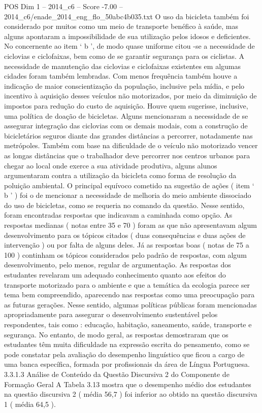 \begin{textsample}{POS Dim 1 – 2014\_c6 – Score -7.00 – 2014\_c6/enade\_2014\_eng\_flo\_50abc4b035.txt}
O uso da bicicleta também foi considerado por muitos como um meio de transporte benéfico à saúde, mas alguns apontaram a impossibilidade de sua utilização pelos idosos e deficientes.
No concernente ao item ‘ b ’, de modo quase uniforme citou -se a necessidade de ciclovias e ciclofaixas, bem como de se garantir segurança para os ciclistas.
A necessidade de manutenção das ciclovias e ciclofaixas existentes em algumas cidades foram também lembradas.
Com menos frequência também houve a indicação de maior conscientização da população, inclusive pela mídia, e pelo incentivo à aquisição desses veículos não motorizados, por meio da diminuição de impostos para redução do custo de aquisição.
Houve quem sugerisse, inclusive, uma política de doação de bicicletas.
Alguns mencionaram a necessidade de se assegurar integração das ciclovias com os demais modais, com a construção de bicicletários seguros diante das grandes distâncias a percorrer, notadamente nas metrópoles.
Também com base na dificuldade de o veículo não motorizado vencer as longas distâncias que o trabalhador deve percorrer nos centros urbanos para chegar ao local onde exerce a sua atividade produtiva, alguns alunos argumentaram contra a utilização da bicicleta como forma de resolução da poluição ambiental.
O principal equívoco cometido na sugestão de ações ( item ‘ b ’ ) foi o de mencionar a necessidade de melhoria do meio ambiente dissociado do uso de bicicletas, como se requeria no comando da questão.
Nesse sentido, foram encontradas respostas que indicavam a caminhada como opção.
As respostas medianas ( notas entre 35 e 70 ) foram as que não apresentavam algum desenvolvimento para os tópicos citados ( duas consequências e duas ações de intervenção ) ou por falta de alguns deles.
Já as respostas boas ( notas de 75 a 100 ) continham os tópicos considerados pelo padrão de respostas, com algum desenvolvimento, pelo menos, regular de argumentação.
As respostas dos estudantes revelaram um adequado conhecimento quanto aos efeitos do transporte motorizado para o ambiente e que a temática da ecologia parece ser tema bem compreendido, aparecendo nas respostas como uma preocupação para as futuras gerações.
Nesse sentido, algumas políticas públicas foram mencionadas apropriadamente para assegurar o desenvolvimento sustentável pelos respondentes, tais como : educação, habitação, saneamento, saúde, transporte e segurança.
No entanto, de modo geral, as respostas demostraram que os estudantes têm muita dificuldade na expressão escrita do pensamento, como se pode constatar pela avaliação do desempenho linguístico que ficou a cargo de uma banca específica, formada por profissionais da área de Língua Portuguesa. 3.3.1.3 Análise de Conteúdo da Questão Discursiva 2 do Componente de Formação Geral A Tabela 3.13 mostra que o desempenho médio dos estudantes na questão discursiva 2 ( média 56,7 ) foi inferior ao obtido na questão discursiva 1 ( média 64,5 ).

\end{textsample}
